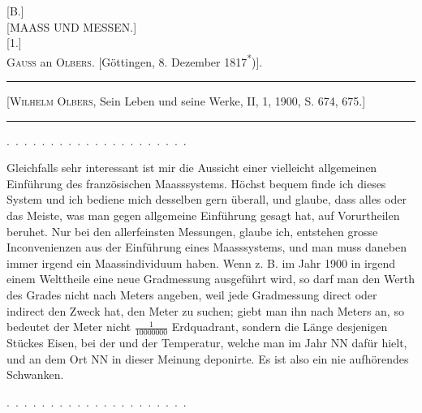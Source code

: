 \clearpage\begingroup{}\NoSourceHead
\begin{center}
[B.]\\[.8em]
[MAASS UND MESSEN.]\\[1.3em]
[1.]\\[.7em]
\textsc{Gauss} an \textsc{Olbers}. [Göttingen, 8. Dezember 1817\textsuperscript{*})].
\par\medskip\rule{.78\textwidth}{.35pt}\par
{\small [\textsc{Wilhelm Olbers}, Sein Leben und seine Werke, II, 1, 1900, S. 674, 675.]}\par
\rule{.78\textwidth}{.35pt}
\end{center}
\begingroup\renewcommand{\thefootnote}{}\endgroup
\noindent .\ .\ .\ .\ .\ .\ .\ .\ .\ .\ .\ .\ .\ .\ .\ .\ .\ .\ .\ .\ .
\par\noindent\hspace*{\parindent}Gleichfalls sehr interessant ist mir die Aussicht einer vielleicht allgemeinen
Einführung des französischen Maasssystems. Höchst bequem finde
ich dieses System und ich bediene mich desselben gern überall, und glaube,
dass alles oder das Meiste, was man gegen allgemeine Einführung gesagt hat,
auf Vorurtheilen beruhet. Nur bei den allerfeinsten Messungen, glaube ich,
entstehen grosse Inconvenienzen aus der Einführung eines  Maasssystems,
und man muss daneben immer irgend ein Maassindividuum haben.
Wenn z. B. im Jahr 1900 in irgend einem Welttheile eine neue Gradmessung
ausgeführt wird, so darf man den Werth des Grades nicht nach Meters angeben,
weil jede Gradmessung direct oder indirect den Zweck hat, den Meter
zu suchen; giebt man ihn nach Meters an, so bedeutet der Meter nicht
\(\frac{1}{10000000}\) Erdquadrant, sondern die Länge desjenigen Stückes Eisen, bei der
und der Temperatur, welche man im Jahr NN dafür hielt, und an dem Ort
NN in dieser Meinung deponirte. Es ist also ein nie aufhörendes Schwanken.
\par\noindent .\ .\ .\ .\ .\ .\ .\ .\ .\ .\ .\ .\ .\ .\ .\ .\ .\ .\ .\ .\ .
\clearpage\endgroup
